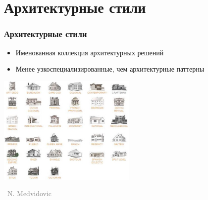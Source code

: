 \documentclass[xetex,mathserif,serif]{beamer}
\newcommand{\attribution}[1] {
	\vspace{-5mm}\begin{flushright}\begin{scriptsize}\textcolor{gray}{\textcopyright\, #1}\end{scriptsize}\end{flushright}
}
\begin{document}
	\section{Архитектурные стили}

	\begin{frame}
		\frametitle{Архитектурные стили}
		\begin{itemize}
			\item Именованная коллекция архитектурных решений
			\item Менее узкоспециализированные, чем архитектурные паттерны
		\end{itemize}
		\begin{center}
			\includegraphics[width=0.5\textwidth]{buildingStyles.png}
			\attribution{N. Medvidovic}
		\end{center}
	\end{frame}
\end{document}
